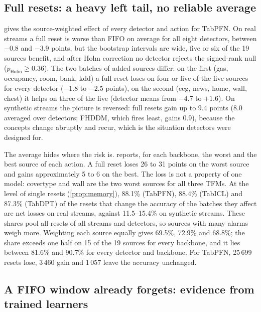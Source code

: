 \documentclass[10pt]{article}
\theoremstyle{definition}
\theoremstyle{remark}
\begin{document}
\subsection{Full resets: a heavy left tail, no reliable average}



 gives the source-weighted effect of every detector and action for TabPFN. On real streams a full
reset is worse than FIFO on average for all eight detectors, between $-0.8$ and $-3.9$ points, but the bootstrap
intervals are wide, five or six of the 19 sources benefit, and after Holm correction no detector rejects the
signed-rank null ($p_{\mathrm{Holm}}\ge0.36$). The two batches of added sources differ: on the first (gas, occupancy,
room, bank, kdd) a full reset loses on four or five of the five sources for every detector ($-1.8$ to $-2.5$ points),
on the second (eeg, news, home, wall, chest) it helps on three of the five (detector means from $-4.7$ to $+1.6$). On synthetic streams the picture is reversed: full resets gain up to 9.4 points
(8.0 averaged over detectors; FHDDM, which fires least, gains 0.9), because the concepts change abruptly and recur,
which is the situation detectors were designed for.



The average hides where the risk is.  reports, for each backbone, the worst and the best source of
each action. A full reset loses 26 to 31 points on the worst source and gains approximately 5 to 6 on the best. The loss is not a
property of one model: covertype and wall are the two worst sources for all three TFMs. At the level of single resets
(\cref{prop:memory}), 88.1\% (TabPFN), 88.4\% (TabICL) and 87.3\% (TabDPT) of the resets that change the accuracy of
the batches they affect are net losses on real streams, against 11.5--15.4\% on synthetic streams. These shares pool
all resets of all streams and detectors, so sources with many alarms weigh more. Weighting each source equally gives
69.5\%, 72.9\% and 68.8\%; the share exceeds one half on 15 of the 19 sources for every backbone, and it lies between
81.6\% and 90.7\% for every detector and backbone. For TabPFN, 25\,699 resets lose, 3\,460 gain and 1\,057 leave the accuracy
unchanged.

\subsection{A FIFO window already forgets: evidence from trained learners}
\end{document}
